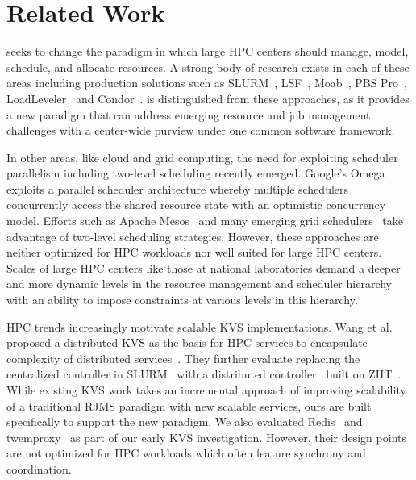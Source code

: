 \section{Related Work}
\flux seeks to change the paradigm in which 
large HPC centers should manage, model, schedule, and
allocate resources. 
A strong body of research exists in each of these areas 
including production solutions such as SLURM~\cite{Jette02slurm}, 
LSF~\cite{LSF}, Moab~\cite{MOAB}, 
PBS Pro~\cite{PSBPro}, LoadLeveler~\cite{LL}
and Condor~\cite{Litzkow88}.
\flux is distinguished from these approaches, as it provides
a new paradigm that can address emerging resource and
job management challenges 
with a center-wide purview under one common 
software framework. 

In other areas, like cloud and grid computing, the need 
for exploiting scheduler parallelism including two-level 
scheduling recently emerged. 
Google's Omega~\cite{Omega} exploits 
a parallel scheduler architecture whereby multiple
schedulers concurrently access the shared resource state
with an optimistic concurrency model. Efforts
such as Apache Mesos~\cite{Mesos} and many emerging
grid schedulers~\cite{MultilevelGrid,Oar} 
take advantage of two-level scheduling strategies.
However, these approaches are neither optimized for HPC workloads 
nor well suited for large HPC centers. 
Scales of large HPC centers like those at national laboratories
demand a deeper and more dynamic levels in the resource management 
and scheduler hierarchy with an ability to impose constraints 
at various levels in this hierarchy.

HPC trends increasingly motivate scalable KVS implementations. 
Wang et al. proposed a distributed KVS 
as the basis for HPC services to encapsulate
complexity of distributed services~\cite{Wang:2013:USE:2503210.2503239}.
%
They further evaluate replacing the centralized controller in
SLURM~\cite{Jette02slurm} with a distributed controller~\cite{Slurmpp}
built on ZHT~\cite{Li:2013:ZLR:2510661.2511401}.
While existing KVS work takes an incremental approach of improving 
scalability of a traditional RJMS paradigm with new scalable services,
ours are built specifically to support the new paradigm. 
We also evaluated Redis~\cite{Redis} and twemproxy~\cite{Twemproxy}
as part of our early KVS investigation.
However, their design points are not optimized
for HPC workloads which often feature synchrony and coordination. 
%

